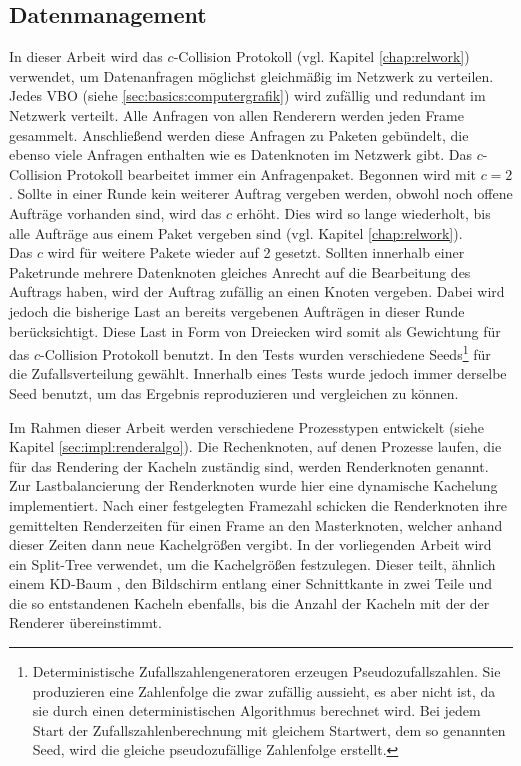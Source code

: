 \subsection{Datenmanagement}
\label{sec:basics:daten}
In dieser Arbeit wird das $c$-Collision Protokoll (vgl. Kapitel \ref{chap:relwork}) verwendet, um Datenanfragen möglichst gleichmäßig im Netzwerk zu verteilen. Jedes VBO (siehe \ref{sec:basics:computergrafik}) wird zufällig und redundant im Netzwerk verteilt. Alle Anfragen von allen Renderern werden jeden Frame gesammelt. Anschließend werden diese Anfragen zu Paketen gebündelt, die ebenso viele Anfragen enthalten wie es Datenknoten im Netzwerk gibt. Das $c$-Collision Protokoll bearbeitet immer ein Anfragenpaket. Begonnen wird mit $c = 2$. Sollte in einer Runde kein weiterer Auftrag vergeben werden, obwohl noch offene Aufträge vorhanden sind, wird das $c$ erhöht. Dies wird so lange wiederholt, bis alle Aufträge aus einem Paket vergeben sind (vgl. Kapitel \ref{chap:relwork}).\\
Das $c$ wird für weitere Pakete wieder auf 2 gesetzt. Sollten innerhalb einer Paketrunde mehrere Datenknoten gleiches Anrecht auf die Bearbeitung des Auftrags haben, wird der Auftrag zufällig an einen Knoten vergeben. Dabei wird jedoch die bisherige Last an bereits vergebenen Aufträgen in dieser Runde berücksichtigt. Diese Last in Form von Dreiecken wird somit als Gewichtung für das $c$-Collision Protokoll benutzt. In den Tests wurden verschiedene Seeds\footnote{Deterministische Zufallszahlengeneratoren erzeugen Pseudozufallszahlen. Sie produzieren eine Zahlenfolge die zwar zufällig aussieht, es aber nicht ist, da sie durch einen deterministischen Algorithmus berechnet wird. Bei jedem Start der Zufallszahlenberechnung mit gleichem Startwert, dem so genannten Seed, wird die gleiche pseudozufällige Zahlenfolge erstellt.} für die Zufallsverteilung gewählt. Innerhalb eines Tests wurde jedoch immer derselbe Seed benutzt, um das Ergebnis reproduzieren und vergleichen zu können.

\vspace{0.5cm}Im Rahmen dieser Arbeit werden verschiedene Prozesstypen entwickelt (siehe Kapitel \ref{sec:impl:renderalgo}). Die Rechenknoten, auf denen Prozesse laufen, die für das Rendering der Kacheln zuständig sind, werden Renderknoten genannt. Zur Lastbalancierung der Renderknoten wurde hier eine dynamische Kachelung implementiert. Nach einer festgelegten Framezahl schicken die Renderknoten ihre gemittelten Renderzeiten für einen Frame an den Masterknoten, welcher anhand dieser Zeiten dann neue Kachelgrößen vergibt. In der vorliegenden Arbeit wird ein Split-Tree verwendet, um die Kachelgrößen festzulegen. Dieser teilt, ähnlich einem KD-Baum \cite{RTR3}, den Bildschirm entlang einer Schnittkante in zwei Teile und die so entstandenen Kacheln ebenfalls, bis die Anzahl der Kacheln mit der der Renderer übereinstimmt. 

